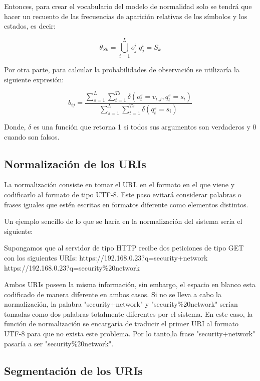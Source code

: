 Entonces, para crear el vocabulario del modelo de normalidad solo se tendrá que hacer un recuento de las frecuencias de aparición relativas de los símbolos y los estados, es decir:

\begin{equation}
\theta_{Sk} = \bigcup\limits_{i=1}^{L} {o_{j}^{i}|q_{j}^{i} = S_{k}}
\end{equation}

Por otra parte, para calcular la probabilidades de observación se utilizaría la siguiente expresión:

\begin{equation}\label{eq:entrenamiento}
b_{ij} = \frac{\sum_{s=1}^{L}\sum_{t=1}^{Ts}\delta(o_{t}^{s} = v_{i,j} ,q_{t}^{s} = s_{i} )}{\sum_{s=1}^{L}\sum_{t=1}^{Ts}\delta(q_{t}^{s} = s_{i}) }
\end{equation}

Donde, $\delta$ es una función que retorna 1 si todos sus argumentos son verdaderos y 0 cuando son falsos.

\subsection*{Normalización de los URIs}
\label{sec:normalizacion}

La normalización consiste en tomar el URL en el formato en el que viene y codificarlo al formato de tipo UTF-8. Este paso evitará considerar palabras o frases iguales que estén escritas en formatos diferente como elementos distintos. 

Un ejemplo sencillo de lo que se haría en la normalización del sistema sería el siguiente:

Supongamos que al servidor de tipo HTTP recibe dos peticiones de tipo GET con los siguientes URIs:
https://192.168.0.23?q=security+network
https://192.168.0.23?q=security\%20network

Ambos URIs poseen la misma información, sin embargo, el espacio en blanco esta codificado de manera diferente en ambos casos. Si no se lleva a cabo la normalización, la palabra "security+network" y "security\%20network" serían tomadas como dos palabras totalmente diferentes por el sistema. En este caso, la función de normalización se encargaría de traducir el primer URI al formato UTF-8 para que no exista este problema. Por lo tanto,la frase "security+network" pasaría a ser  "security\%20network".


\subsection*{Segmentación de los URIs}
\label{sec:delimitadores}

